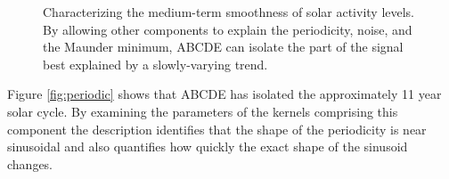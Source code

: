 \documentclass[letterpaper]{article}
\newcommand{\procedurename}{ABCDE}
\begin{document}
\begin{figure}[h!]
\centering
{}
\caption{Characterizing the medium-term smoothness of solar activity levels.  By allowing other components to explain the periodicity, noise, and the Maunder minimum, \procedurename{} can isolate the part of the signal best explained by a slowly-varying trend.}
\label{fig:smooth}
\end{figure}
%
%
%
%
%
Figure \ref{fig:periodic} shows that \procedurename{} has isolated the approximately 11 year solar cycle.
By examining the parameters of the kernels comprising this component the description identifies that the shape of the periodicity is near sinusoidal and also quantifies how quickly the exact shape of the sinusoid changes.
\end{document}
